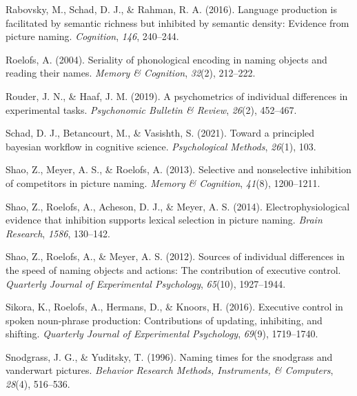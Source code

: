 \documentclass[
  man,floatsintext]{apa6}
\newlength{\cslhangindent}
\newlength{\cslentryspacingunit} %
\newenvironment{CSLReferences}[2] %
 {%
  \setlength{\parindent}{0pt}
  \ifodd #1
  \let\oldpar\par
  \def\par{\hangindent=\cslhangindent\oldpar}
  \fi
  \setlength{\parskip}{#2\cslentryspacingunit}
 }%
 {}
\begin{document}
\begin{CSLReferences}{1}{0}
\leavevmode{}%
Rabovsky, M., Schad, D. J., \& Rahman, R. A. (2016). Language production is facilitated by semantic richness but inhibited by semantic density: Evidence from picture naming. \emph{Cognition}, \emph{146}, 240--244.

\leavevmode{}%
Roelofs, A. (2004). Seriality of phonological encoding in naming objects and reading their names. \emph{Memory \& Cognition}, \emph{32}(2), 212--222.

\leavevmode{}%
Rouder, J. N., \& Haaf, J. M. (2019). A psychometrics of individual differences in experimental tasks. \emph{Psychonomic Bulletin \& Review}, \emph{26}(2), 452--467.

\leavevmode{}%
Schad, D. J., Betancourt, M., \& Vasishth, S. (2021). Toward a principled bayesian workflow in cognitive science. \emph{Psychological Methods}, \emph{26}(1), 103.

\leavevmode{}%
Shao, Z., Meyer, A. S., \& Roelofs, A. (2013). Selective and nonselective inhibition of competitors in picture naming. \emph{Memory \& Cognition}, \emph{41}(8), 1200--1211.

\leavevmode{}%
Shao, Z., Roelofs, A., Acheson, D. J., \& Meyer, A. S. (2014). Electrophysiological evidence that inhibition supports lexical selection in picture naming. \emph{Brain Research}, \emph{1586}, 130--142.

\leavevmode{}%
Shao, Z., Roelofs, A., \& Meyer, A. S. (2012). Sources of individual differences in the speed of naming objects and actions: The contribution of executive control. \emph{Quarterly Journal of Experimental Psychology}, \emph{65}(10), 1927--1944.

\leavevmode{}%
Sikora, K., Roelofs, A., Hermans, D., \& Knoors, H. (2016). Executive control in spoken noun-phrase production: Contributions of updating, inhibiting, and shifting. \emph{Quarterly Journal of Experimental Psychology}, \emph{69}(9), 1719--1740.

\leavevmode{}%
Snodgrass, J. G., \& Yuditsky, T. (1996). Naming times for the snodgrass and vanderwart pictures. \emph{Behavior Research Methods, Instruments, \& Computers}, \emph{28}(4), 516--536.


\end{CSLReferences}
\end{document}
